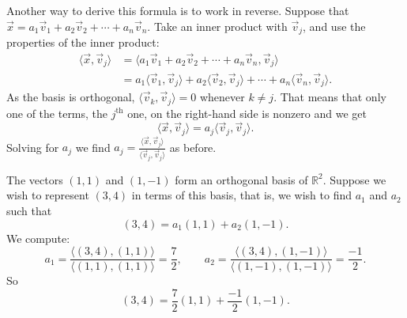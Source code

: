 Another way to derive this formula is to work in reverse.  Suppose that
$\vec{x} =
a_1 \vec{v}_1 +
a_2 \vec{v}_2 + \cdots +
a_n \vec{v}_n$.  Take an inner product with $\vec{v}_j$, and
use the properties of the inner product:
\begin{equation*}
\begin{split}
\langle \vec{x} , \vec{v}_j \rangle
& =
\langle a_1 \vec{v}_1 +
a_2 \vec{v}_2 + \cdots +
a_n \vec{v}_n , \vec{v}_j \rangle
\\
& =
a_1 \langle \vec{v}_1 , \vec{v}_j \rangle +
a_2 \langle \vec{v}_2 , \vec{v}_j \rangle +
\cdots +
a_n \langle \vec{v}_n , \vec{v}_j \rangle .
\end{split}
\end{equation*}
As the basis is orthogonal,
$\langle \vec{v}_k , \vec{v}_j \rangle = 0$ whenever
$k \neq j$.  That means that only one of the terms, the $j^{\text{th}}$ one,
on the right-hand side is nonzero and we get
\begin{equation*}
\langle \vec{x} , \vec{v}_j \rangle
=
a_j \langle \vec{v}_j , \vec{v}_j \rangle .
\end{equation*}
Solving for $a_j$ we find $a_j =
\frac{\langle \vec{x}, \vec{v}_j \rangle}{
\langle \vec{v}_j, \vec{v}_j \rangle
}$ as before.

\begin{example}
The vectors $(1,1)$ and $(1,-1)$ form an orthogonal basis of ${\mathbb{R}}^2$.
Suppose we wish to represent $(3,4)$ in terms of this basis,
that is, we wish to find $a_1$ and $a_2$ such that
\begin{equation*}
(3,4) = a_1 (1,1) + a_2 (1,-1) .
\end{equation*}
We compute:
\begin{equation*}
a_1 =
\frac{\langle (3,4), (1,1) \rangle}{
\langle (1,1), (1,1) \rangle
}
=
\frac{7}{2}, \qquad
a_2 =
\frac{\langle (3,4), (1,-1) \rangle}{
\langle (1,-1), (1,-1) \rangle
}
=
\frac{-1}{2} .
\end{equation*}
So
\begin{equation*}
(3,4) = \frac{7}{2} (1,1) + \frac{-1}{2} (1,-1) .
\end{equation*}
\end{example}

